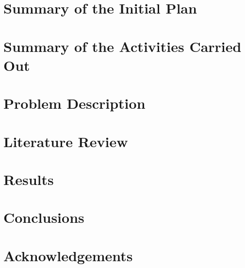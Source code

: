 \documentclass[12pt,a4paper]{article}
\begin{document}
\frenchspacing



\newpage


\newpage


\newpage
\tableofcontents
\newpage

\section*{Summary of the Initial Plan}



\newpage

\section*{Summary of the Activities Carried Out}



\newpage

\section{Problem Description}



\section{Literature Review}



\section{Results}



\section{Conclusions}



\section*{Acknowledgements}



\newpage
{}
{}


\end{document}
